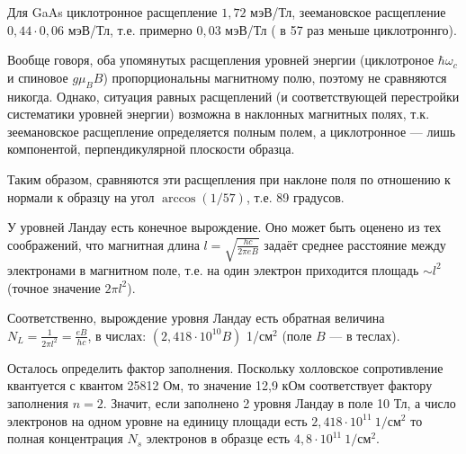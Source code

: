 \documentclass[a4paper]{article}
\begin{document}
\begin{hiProb}[Т12-4]
\end{hiProb}
\begin{sol}
Для GaAs циклотронное расщепление $1,72$ мэВ/Тл,
зеемановское расщепление $0,44 \cdot 0,06$ мэВ/Тл,
т.\:е. примерно $0,03$ мэВ/Тл ( в 57 раз меньше
циклотроннго).

Вообще говоря, оба упомянутых расщепления уровней
энергии (циклотроное $\hbar \omega_c$ и спиновое
$g \mu_B B$) пропорциональны магнитному полю,
поэтому не сравняются никогда. Однако, ситуация
равных расщеплений (и соответствующей перестройки
систематики уровней энергии) возможна в наклонных
магнитных полях, т.\:к. зеемановское
расщепление определяется полным полем, а циклотронное
--- лишь компонентой, перпендикулярной плоскости образца.

Таким образом, сравняются эти расщепления при
наклоне поля по отношению к нормали к образцу
на угол $\arccos (1 /57)$, т.\:е. 89 градусов.
\end{sol}
\begin{hiProb}[Т12-5]
\end{hiProb}
\begin{sol}
У уровней Ландау есть конечное вырождение. Оно
может быть оценено из тех соображений, что магнитная
длина $l= \sqrt{\frac{hc}{2\pi eB}} $ 
задаёт среднее расстояние между электронами
в магнитном поле, т.\:е. на один
электрон приходится площадь $\sim l^2$ (точное
значение $2\pi l^2$).

Соответственно, вырождение уровня Ландау есть обратная
величина $N_L= \frac{1}{2\pi l^2}= \frac{eB}{hc}$,
в числах: $(2,418\cdot 10^10 B)$ 1/см$^2$ (поле  $B$ 
--- в теслах).

Осталось определить фактор заполнения. Поскольку
холловское сопротивление квантуется с
квантом 25812 Ом, то значение 12,9 кОм соответствует
фактору заполнения $n=2$. Значит, если заполнено
2 уровня Ландау в поле 10 Тл, а число электронов
на одном уровне на единицу площади есть $2,418\cdot 10^{11}\ 1/\text{см}^2$ то полная концентрация $N_s$
электронов в образце есть $4,8 \cdot 10^{11} \ 1 /\text{см}^2$.
\end{sol}
\begin{hiProb}[Т12-6]
\end{hiProb}
\end{document}
